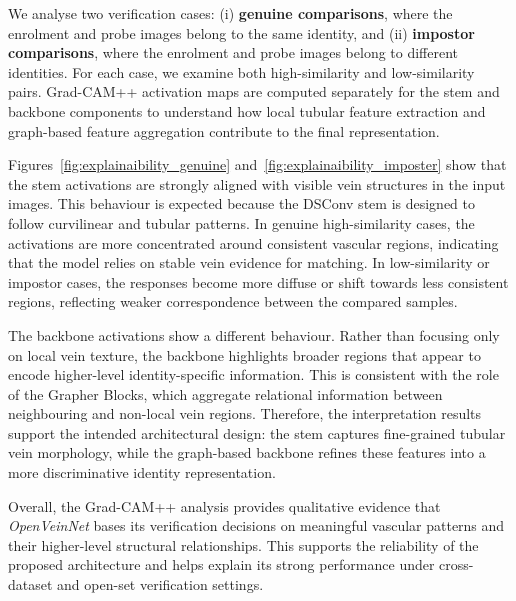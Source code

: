 \documentclass[10pt,journal,compsoc]{IEEEtran}
\begin{document}
We analyse two verification cases: (i) \textbf{genuine comparisons}, where the enrolment and probe images belong to the same identity, and (ii) \textbf{impostor comparisons}, where the enrolment and probe images belong to different identities. For each case, we examine both high-similarity and low-similarity pairs. Grad-CAM++ activation maps are computed separately for the stem and backbone components to understand how local tubular feature extraction and graph-based feature aggregation contribute to the final representation.

Figures~\ref{fig:explainaibility_genuine} and~\ref{fig:explainaibility_imposter} show that the stem activations are strongly aligned with visible vein structures in the input images. This behaviour is expected because the DSConv stem is designed to follow curvilinear and tubular patterns. In genuine high-similarity cases, the activations are more concentrated around consistent vascular regions, indicating that the model relies on stable vein evidence for matching. In low-similarity or impostor cases, the responses become more diffuse or shift towards less consistent regions, reflecting weaker correspondence between the compared samples.

The backbone activations show a different behaviour. Rather than focusing only on local vein texture, the backbone highlights broader regions that appear to encode higher-level identity-specific information. This is consistent with the role of the Grapher Blocks, which aggregate relational information between neighbouring and non-local vein regions. Therefore, the interpretation results support the intended architectural design: the stem captures fine-grained tubular vein morphology, while the graph-based backbone refines these features into a more discriminative identity representation.

Overall, the Grad-CAM++ analysis provides qualitative evidence that \textit{OpenVeinNet} bases its verification decisions on meaningful vascular patterns and their higher-level structural relationships. This supports the reliability of the proposed architecture and helps explain its strong performance under cross-dataset and open-set verification settings.
\end{document}
